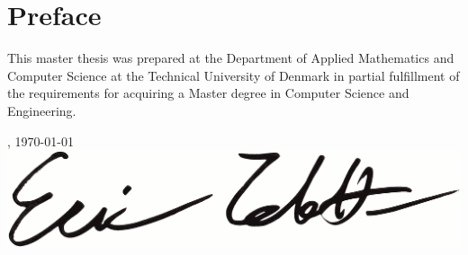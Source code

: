%
\chapter{Preface}
This master thesis was prepared at the Department of Applied Mathematics and
Computer Science at the Technical University of Denmark in partial fulfillment
of the requirements for acquiring a Master degree in Computer Science and
Engineering.

\vfill

{
\centering
    \thesislocation{}, \today\\[1cm]
    \hspace{3cm}\includegraphics[scale=0.25]{graphics/Signature.eps}
    \par
    \noindent
    \vspace{1cm}
\begin{flushright}
    \thesisauthor{}
\end{flushright}
}
